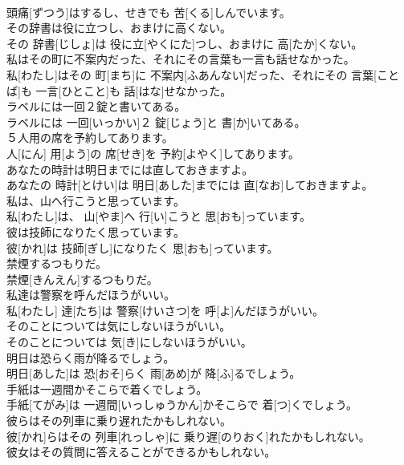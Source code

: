 \documentclass[8pt]{extreport}
\begin{document}
\begin{CJK}{UTF8}{min}
\\	頭痛[ずつう]はするし、せきでも 苦[くる]しんでいます。	
\\	その辞書は役に立つし、おまけに高くない。	
\\	その 辞書[じしょ]は 役に立[やくにた]つし、おまけに 高[たか]くない。	
\\	私はその町に不案内だった、それにその言葉も一言も話せなかった。	
\\	私[わたし]はその 町[まち]に 不案内[ふあんない]だった、それにその 言葉[ことば]も 一言[ひとこと]も 話[はな]せなかった。	
\\	ラベルには一回２錠と書いてある。	
\\	ラベルには 一回[いっかい]２ 錠[じょう]と 書[か]いてある。	
\\	５人用の席を予約してあります。	
\\	人[にん] 用[よう]の 席[せき]を 予約[よやく]してあります。	
\\	あなたの時計は明日までには直しておきますよ。	
\\	あなたの 時計[とけい]は 明日[あした]までには 直[なお]しておきますよ。	
\\	私は、山へ行こうと思っています。	
\\	私[わたし]は、 山[やま]へ 行[い]こうと 思[おも]っています。	
\\	彼は技師になりたく思っています。	
\\	彼[かれ]は 技師[ぎし]になりたく 思[おも]っています。	
\\	禁煙するつもりだ。	
\\	禁煙[きんえん]するつもりだ。	
\\	私達は警察を呼んだほうがいい。	
\\	私[わたし] 達[たち]は 警察[けいさつ]を 呼[よ]んだほうがいい。	
\\	そのことについては気にしないほうがいい。	
\\	そのことについては 気[き]にしないほうがいい。	
\\	明日は恐らく雨が降るでしょう。	
\\	明日[あした]は 恐[おそ]らく 雨[あめ]が 降[ふ]るでしょう。	
\\	手紙は一週間かそこらで着くでしょう。	
\\	手紙[てがみ]は 一週間[いっしゅうかん]かそこらで 着[つ]くでしょう。	
\\	彼らはその列車に乗り遅れたかもしれない。	
\\	彼[かれ]らはその 列車[れっしゃ]に 乗り遅[のりおく]れたかもしれない。	
\\	彼女はその質問に答えることができるかもしれない。	

\end{CJK}
\end{document}
